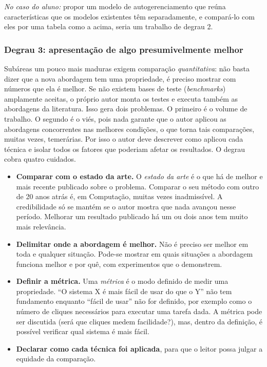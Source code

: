 \documentclass[10pt,a4paper]{extarticle}
\theoremstyle{definition}
\begin{document}
\emph{No caso do aluno:} propor um modelo de autogerenciamento que reúna características que os modelos existentes têm separadamente, e compará-lo com eles por uma tabela como a acima, seria um trabalho de degrau 2.

\subsubsection*{Degrau 3: apresentação de algo presumivelmente melhor}

Subáreas um pouco mais maduras exigem comparação \emph{quantitativa}: não basta dizer que a nova abordagem tem uma propriedade, é preciso mostrar com números que ela é melhor. Se não existem bases de teste (\emph{benchmarks}) amplamente aceitas, o próprio autor monta os testes e executa também as abordagens da literatura. Isso gera dois problemas. O primeiro é o volume de trabalho. O segundo é o viés, pois nada garante que o autor aplicou as abordagens concorrentes nas melhores condições, o que torna tais comparações, muitas vezes, temerárias. Por isso o autor deve descrever como aplicou cada técnica e isolar todos os fatores que poderiam afetar os resultados. O degrau cobra quatro cuidados.
\begin{itemize}
  \item \textbf{Comparar com o estado da arte.} O \emph{estado da arte} é o que há de melhor e mais recente publicado sobre o problema. Comparar o seu método com outro de 20 anos atrás é, em Computação, muitas vezes inadmissível. A credibilidade só se mantém se o autor mostra que nada avançou nesse período. Melhorar um resultado publicado há um ou dois anos tem muito mais relevância.
  \item \textbf{Delimitar onde a abordagem é melhor.} Não é preciso ser melhor em toda e qualquer situação. Pode-se mostrar em quais situações a abordagem funciona melhor e por quê, com experimentos que o demonstrem.
  \item \textbf{Definir a métrica.} Uma \emph{métrica} é o modo definido de medir uma propriedade. \enquote{O sistema X é mais fácil de usar do que o Y} não tem fundamento enquanto \enquote{fácil de usar} não for definido, por exemplo como o número de cliques necessários para executar uma tarefa dada. A métrica pode ser discutida (será que cliques medem facilidade?), mas, dentro da definição, é possível verificar qual sistema é mais fácil.
  \item \textbf{Declarar como cada técnica foi aplicada}, para que o leitor possa julgar a equidade da comparação.
\end{itemize}
\end{document}
